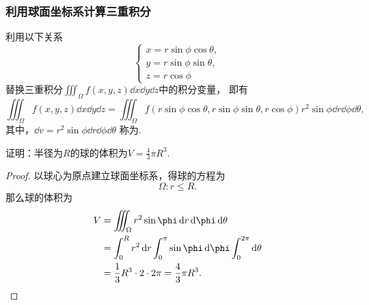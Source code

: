 \subsubsection{利用球面坐标系计算三重积分}
利用以下关系\[
	\left\{ \begin{array}{l}
		x = r \sin\phi \cos\theta, \\
		y = r \sin\phi \sin\theta, \\
		z = r \cos\phi
	\end{array} \right.
\]替换三重积分\(\iiint_\Omega{f(x,y,z)\dd{x}\dd{y}\dd{z}}\)中的积分变量，
即有\[
	\iiint_\Omega{f(x,y,z)\dd{x}\dd{y}\dd{z}}
	= \iiint_\Omega{f(r \sin\phi \cos\theta,r \sin\phi \sin\theta,r \cos\phi) r^2 \sin\phi \dd{r} \dd{\phi} \dd{\theta}},
\]
其中，\(\dd{v} = r^2 \sin\phi \dd{r} \dd{\phi} \dd{\theta}\)
称为.

\begin{example}
证明：半径为\(R\)的球的体积为\(V = \frac{4}{3} \pi R^3\).
\begin{proof}
以球心为原点建立球面坐标系，得球的方程为\[
	\Omega: r \leq R.
\]
那么球的体积为\begin{align*}
	V &= \iiint_\Omega r^2 \sin\phi \dd{r} \dd{\phi} \dd{\theta} \\
	&= \int_0^R r^2 \dd{r} \int_0^\pi \sin\phi \dd{\phi} \int_0^{2\pi} \dd{\theta} \\
	&= \frac{1}{3} R^3 \cdot 2 \cdot 2\pi
	= \frac{4}{3} \pi R^3.
	\qedhere
\end{align*}
\end{proof}
\end{example}
